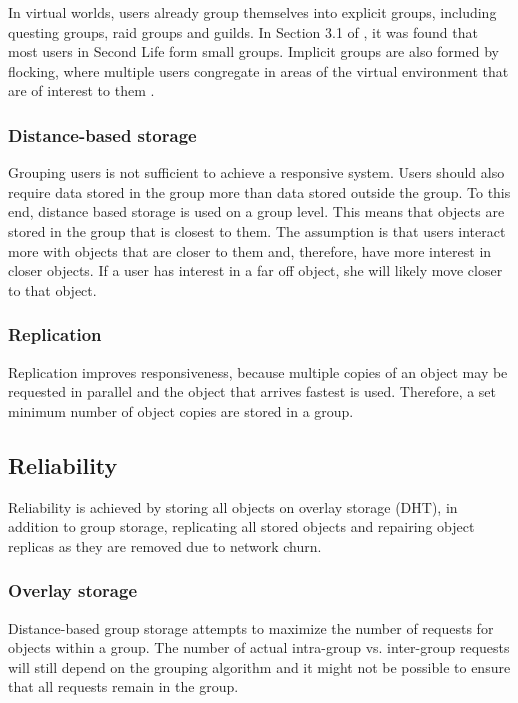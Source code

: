 In virtual worlds, users already group themselves into explicit groups, including questing groups, raid groups and guilds. In Section 3.1 of \cite{varvello_phd}, it was found that most users in Second Life form small groups.  Implicit groups are also formed by flocking, where multiple users congregate in areas of the virtual environment that are of interest to them \cite{flocking}.

\subsubsection{Distance-based storage}
Grouping users is not sufficient to achieve a responsive system. Users should also require data stored in the group more than data stored outside the group. To this end, distance based storage is used on a group level. This means that objects are stored in the group that is closest to them. The assumption is that users interact more with objects that are closer to them and, therefore, have more interest in closer objects. If a user has interest in a far off object, she will likely move closer to that object.

\subsubsection{Replication}

Replication improves responsiveness, because multiple copies of an object may be requested in parallel and the object that arrives fastest is used. Therefore, a set minimum number of object copies are stored in a group.

\subsection{Reliability}

Reliability is achieved by storing all objects on overlay storage (DHT), in addition to group storage, replicating all stored objects and repairing object replicas as they are removed due to network churn.

\subsubsection{Overlay storage}
Distance-based group storage attempts to maximize the number of requests for objects within a group. The number of actual intra-group vs. inter-group requests will still depend on the grouping algorithm and it might not be possible to ensure that all requests remain in the group.


